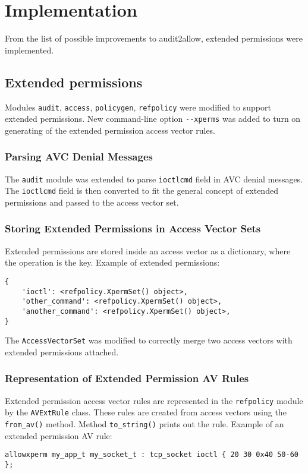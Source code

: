 \chapter{Implementation}
From the list of possible improvements to audit2allow, extended permissions were
implemented.

\section{Extended permissions}
Modules \texttt{audit}, \texttt{access}, \texttt{policygen}, \texttt{refpolicy}
were modified to support extended permissions. New command-line option
\texttt{-{}-xperms} was added to turn on generating of the extended permission
access vector rules.

\subsection{Parsing AVC Denial Messages}
The \texttt{audit} module was extended to parse \texttt{ioctlcmd} field in AVC
denial messages. The \texttt{ioctlcmd} field is then converted to fit the
general concept of extended permissions and passed to the access vector set.

\subsection{Storing Extended Permissions in Access Vector Sets}
Extended permissions are stored inside an access vector as a dictionary, where
the operation is the key. Example of extended permissions:
\begin{lstlisting}
{
    'ioctl': <refpolicy.XpermSet() object>,
    'other_command': <refpolicy.XpermSet() object>,
    'another_command': <refpolicy.XpermSet() object>,
}
\end{lstlisting}
The \texttt{AccessVectorSet} was modified to correctly merge two access vectors
with extended permissions attached.

\subsection{Representation of Extended Permission AV Rules}
Extended permission access vector rules are represented in the
\texttt{refpolicy} module by the \texttt{AVExtRule} class. These rules are
created from access vectors using the \texttt{from\_av()} method. Method
\texttt{to\_string()} prints out the rule. Example of an extended permission AV
rule:
\begin{lstlisting}
allowxperm my_app_t my_socket_t : tcp_socket ioctl { 20 30 0x40 50-60 };
\end{lstlisting}


